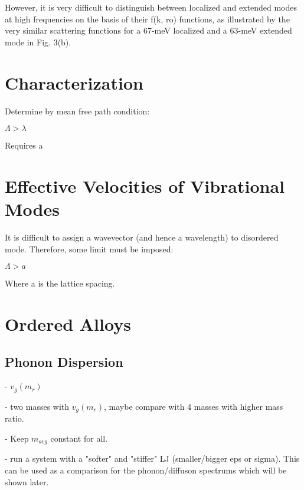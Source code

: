 \documentclass[aps,prb,preprint,superscriptaddress,amsmath,amssymb,floatfix]{revtex4}
\begin{document}
However, it is very
difficult to distinguish between localized and extended
modes at high frequencies on the basis of their f(k, ro)
functions, as illustrated by the very similar scattering
functions for a 67-meV localized and a 63-meV extended
mode in Fig. 3(b). \cite{biswas_vibrational_1988}


\section{\label{S-Motivation}Characterization}

Determine by mean free path condition:

$\Lambda > \lambda$

Requires a 

\section{\label{S-Motivation}Effective Velocities of Vibrational Modes}




It is difficult to assign a wavevector (and hence a wavelength) to 
disordered mode.  Therefore, some limit must be imposed:

$\Lambda > a$

Where a is the lattice spacing.

\section{\label{S-Motivation}Ordered Alloys}

\subsection{\label{S-Introduction-OrderedAlloy-PhonoDispersion}Phonon 
Dispersion}
- $v_g(m_{r})$

- two masses with $v_g(m_{r})$, maybe compare with 4 masses with higher mass 
ratio.  

- Keep  $m_{avg}$ constant for all.

- run a system with a "softer" and "stiffer" LJ (smaller/bigger eps or sigma). 
This can be used as a comparison for the phonon/diffuson spectrums which will be 
shown later.  
\end{document}
